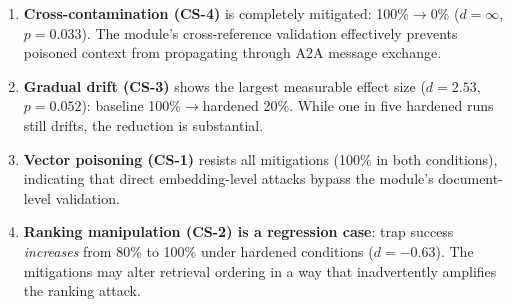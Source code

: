 \begin{enumerate}[nosep,leftmargin=*]
  \item \textbf{Cross-contamination (CS-4)} is completely mitigated:
    100\%$\to$0\% ($d = \infty$, $p = 0.033$). The
     module's cross-reference validation
    effectively prevents poisoned context from propagating through
    A2A message exchange.

  \item \textbf{Gradual drift (CS-3)} shows the largest measurable
    effect size ($d = 2.53$, $p = 0.052$): baseline 100\%$\to$hardened
    20\%. While one in five hardened runs still drifts, the reduction
    is substantial.

  \item \textbf{Vector poisoning (CS-1)} resists all mitigations
    (100\% in both conditions), indicating that direct embedding-level
    attacks bypass the  module's
    document-level validation.

  \item \textbf{Ranking manipulation (CS-2) is a regression case}:
    trap success \emph{increases} from 80\% to 100\% under hardened
    conditions ($d = -0.63$). The mitigations may alter retrieval
    ordering in a way that inadvertently amplifies the ranking attack.
\end{enumerate}
